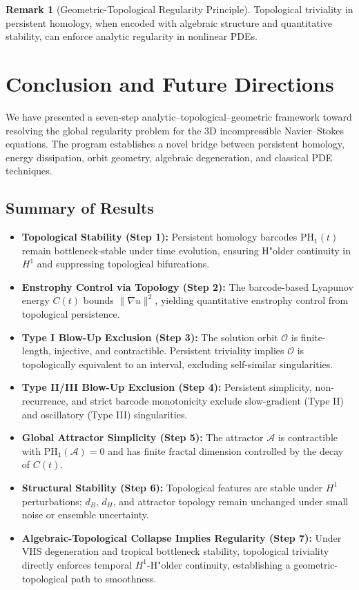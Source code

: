 \documentclass[11pt]{article}
\theoremstyle{definition}
\newtheorem{remark}[theorem]{Remark}
\begin{document}
\begin{remark}[Geometric-Topological Regularity Principle]
Topological triviality in persistent homology, when encoded with algebraic structure and quantitative stability, can enforce analytic regularity in nonlinear PDEs.
\end{remark}

\section{Conclusion and Future Directions}
\label{sec:conclusion}

We have presented a seven-step analytic–topological–geometric framework toward resolving the global regularity problem for the 3D incompressible Navier--Stokes equations. The program establishes a novel bridge between persistent homology, energy dissipation, orbit geometry, algebraic degeneration, and classical PDE techniques.

\subsection*{Summary of Results}
\begin{itemize}
  \item \textbf{Topological Stability (Step 1):} Persistent homology barcodes $\mathrm{PH}_1(t)$ remain bottleneck-stable under time evolution, ensuring H"older continuity in $H^1$ and suppressing topological bifurcations.
  \item \textbf{Enstrophy Control via Topology (Step 2):} The barcode-based Lyapunov energy $C(t)$ bounds $\|\nabla u\|^2$, yielding quantitative enstrophy control from topological persistence.
  \item \textbf{Type I Blow-Up Exclusion (Step 3):} The solution orbit $\mathcal{O}$ is finite-length, injective, and contractible. Persistent triviality implies $\mathcal{O}$ is topologically equivalent to an interval, excluding self-similar singularities.
  \item \textbf{Type II/III Blow-Up Exclusion (Step 4):} Persistent simplicity, non-recurrence, and strict barcode monotonicity exclude slow-gradient (Type II) and oscillatory (Type III) singularities.
  \item \textbf{Global Attractor Simplicity (Step 5):} The attractor $\mathcal{A}$ is contractible with $\mathrm{PH}_1(\mathcal{A}) = 0$ and has finite fractal dimension controlled by the decay of $C(t)$.
  \item \textbf{Structural Stability (Step 6):} Topological features are stable under $H^1$ perturbations; $d_B$, $d_H$, and attractor topology remain unchanged under small noise or ensemble uncertainty.
  \item \textbf{Algebraic-Topological Collapse Implies Regularity (Step 7):} Under VHS degeneration and tropical bottleneck stability, topological triviality directly enforces temporal $H^1$-H"older continuity, establishing a geometric-topological path to smoothness.
\end{itemize}
\end{document}
